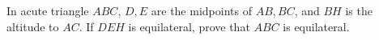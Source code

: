 In acute triangle $ABC$, $D,E$ are the midpoints of $AB,BC$, and $BH$ is the altitude to $AC$. If $DEH$ is equilateral, prove that $ABC$ is equilateral.
